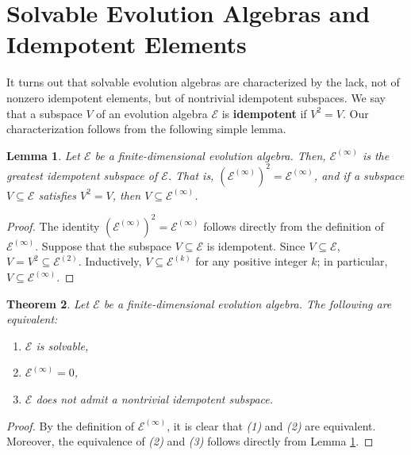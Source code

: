 \documentclass[11pt]{article}
\newtheorem{thm}{Theorem}[section]
\newtheorem{lem}[thm]{Lemma}
\theoremstyle{definition}
\numberwithin{equation}{section}
\begin{document}
\section{Solvable Evolution Algebras and Idempotent Elements}


\begin{aiblock}


It turns out that solvable evolution algebras are characterized by the lack, not of nonzero idempotent elements, but of nontrivial idempotent subspaces. We say that a subspace $V$ of an evolution algebra $\mathcal E$ is \textbf{idempotent} if $V^2=V$. Our characterization follows from the following simple lemma.


\begin{lem}\label{einftyisidempotent}
Let $\mathcal E$ be a finite-dimensional evolution algebra. Then, $\mathcal E^{(\infty)}$ is the greatest idempotent subspace of $\mathcal E$. That is, $\left(\mathcal E^{(\infty)}\right)^2 = \mathcal E^{(\infty)}$, and if a subspace $V\subseteq \mathcal E$ satisfies $V^2 = V$, then $V\subseteq \mathcal E^{(\infty)}$.

\end{lem}
\begin{proof}
    The identity $\left(\mathcal E^{(\infty)}\right)^2 = \mathcal E^{(\infty)}$ follows directly from the definition of $\mathcal E^{(\infty)}$. Suppose that the subspace $V\subseteq \mathcal E$ is idempotent. Since $V\subseteq \mathcal E$, $V = V^2 \subseteq \mathcal E^{(2)}$. Inductively, $V\subseteq \mathcal E^{(k)}$ for any positive integer $k$; in particular, $V\subseteq \mathcal E^{(\infty)}$.
\end{proof}

\begin{thm}\label{solvableiff}
Let $\mathcal E$ be a finite-dimensional evolution algebra. The following are equivalent:

\begin{enumerate}
        \item $\mathcal E$ is solvable,
        \item $\mathcal E^{(\infty)} = 0$,
        \item $\mathcal E$ does not admit a nontrivial idempotent subspace.
\end{enumerate}
\end{thm}
\begin{proof}
    By the definition of $\mathcal E^{(\infty)}$, it is clear that \textit{(1)} and \textit{(2)} are equivalent. Moreover, the equivalence of \textit{(2)} and \textit{(3)} follows directly from Lemma \ref{einftyisidempotent}.
\end{proof}



\end{aiblock}
\end{document}
